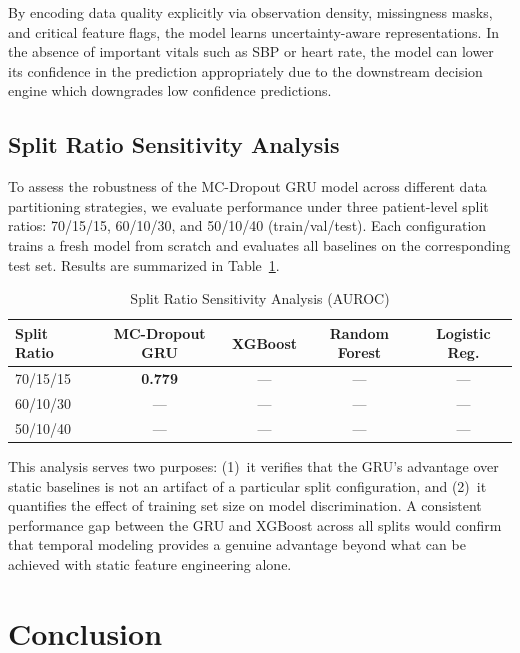 \documentclass[conference]{IEEEtran}
\begin{document}
By encoding data quality explicitly via observation density, missingness masks, and critical feature flags, the model learns uncertainty-aware representations. In the absence of important vitals such as SBP or heart rate, the model can lower its confidence in the prediction appropriately due to the downstream decision engine which downgrades low confidence predictions.

\subsection{Split Ratio Sensitivity Analysis}

To assess the robustness of the MC-Dropout GRU model across different data partitioning strategies, we evaluate performance under three patient-level split ratios: 70/15/15, 60/10/30, and 50/10/40 (train/val/test). Each configuration trains a fresh model from scratch and evaluates all baselines on the corresponding test set. Results are summarized in Table~\ref{tab:split_sensitivity}.

\begin{table}[h]
\caption{Split Ratio Sensitivity Analysis (AUROC)}
\label{tab:split_sensitivity}
\centering
\begin{tabular}{lcccc}
\toprule
\textbf{Split Ratio} & \textbf{MC-Dropout GRU} & \textbf{XGBoost} & \textbf{Random Forest} & \textbf{Logistic Reg.} \\
\midrule
70/15/15 & \textbf{0.779} & --- & --- & --- \\
60/10/30 & --- & --- & --- & --- \\
50/10/40 & --- & --- & --- & --- \\
\bottomrule
\end{tabular}
\end{table}

This analysis serves two purposes: (1)~it verifies that the GRU's advantage over static baselines is not an artifact of a particular split configuration, and (2)~it quantifies the effect of training set size on model discrimination. A consistent performance gap between the GRU and XGBoost across all splits would confirm that temporal modeling provides a genuine advantage beyond what can be achieved with static feature engineering alone.

\section{Conclusion}
\end{document}

